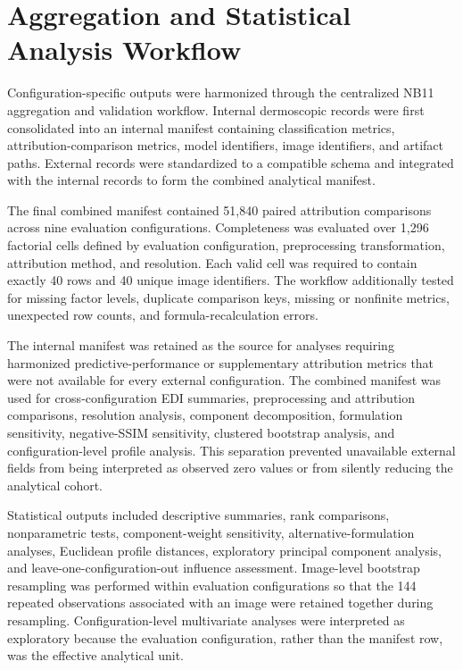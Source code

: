 \section{Aggregation and Statistical Analysis Workflow}

Configuration-specific outputs were harmonized through the centralized NB11 aggregation and validation workflow. Internal dermoscopic records were first consolidated into an internal manifest containing classification metrics, attribution-comparison metrics, model identifiers, image identifiers, and artifact paths. External records were standardized to a compatible schema and integrated with the internal records to form the combined analytical manifest.

The final combined manifest contained 51,840 paired attribution comparisons across nine evaluation configurations. Completeness was evaluated over 1,296 factorial cells defined by evaluation configuration, preprocessing transformation, attribution method, and resolution. Each valid cell was required to contain exactly 40 rows and 40 unique image identifiers. The workflow additionally tested for missing factor levels, duplicate comparison keys, missing or nonfinite metrics, unexpected row counts, and formula-recalculation errors.

The internal manifest was retained as the source for analyses requiring harmonized predictive-performance or supplementary attribution metrics that were not available for every external configuration. The combined manifest was used for cross-configuration EDI summaries, preprocessing and attribution comparisons, resolution analysis, component decomposition, formulation sensitivity, negative-SSIM sensitivity, clustered bootstrap analysis, and configuration-level profile analysis. This separation prevented unavailable external fields from being interpreted as observed zero values or from silently reducing the analytical cohort.

Statistical outputs included descriptive summaries, rank comparisons, nonparametric tests, component-weight sensitivity, alternative-formulation analyses, Euclidean profile distances, exploratory principal component analysis, and leave-one-configuration-out influence assessment. Image-level bootstrap resampling was performed within evaluation configurations so that the 144 repeated observations associated with an image were retained together during resampling. Configuration-level multivariate analyses were interpreted as exploratory because the evaluation configuration, rather than the manifest row, was the effective analytical unit.

